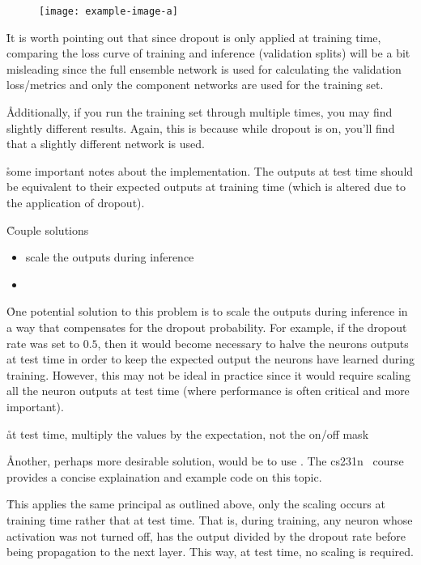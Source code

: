 \begin{figure}[htp]
	\centering
	\texttt{[image: example-image-a]}\hfil
	\caption{}
	\label{fig:regularization_dropout_overview_test}
\end{figure}

\r{It is worth pointing out that since dropout is only applied at training time, comparing the loss curve of training and inference (validation splits) will be a bit misleading since the full ensemble network is used for calculating the validation loss/metrics and only the component  networks are used for the training set.}

\r{Additionally, if you run the training set through multiple times, you may find slightly different results. Again, this is because while dropout is on, you'll find that a slightly different network is used. }

\r{some important notes about the implementation. The outputs at test time should be equivalent to their expected outputs at training time (which is altered due to the application of dropout).}

\r{Couple solutions}
\begin{itemize}[noitemsep,topsep=0pt]
	\item scale the outputs during inference
	\item
\end{itemize}

\r{One potential solution to this problem is to scale the outputs during inference in a way that compensates for the dropout probability.  For example, if the dropout rate was set to $0.5$, then it would become necessary to halve the neurons outputs at test time in order to keep the expected output the neurons have learned during training.  However, this may not be ideal in practice since it would require scaling all the neuron outputs at test time (where performance is often critical and more important).}

\r{at test time, multiply the values by the expectation, not the on/off mask}

\r{Another, perhaps more desirable solution, would be to use . The cs231n~\cite{cs231n} course provides a concise explaination and example code on this topic.}

\r{This applies the same principal as outlined above, only the scaling occurs at training time rather that at test time. That is, during training, any neuron whose activation was not turned off, has the output divided by the dropout rate before being propagation to the next layer.  This way, at test time, no scaling is required.}

